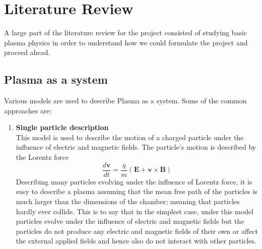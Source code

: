 \documentclass[12pt]{article}
\begin{document}
	\section{Literature Review}
	A large part of the literature review for the project consisted of studying basic plasma physics in order to understand how we could formulate the project and proceed ahead. 
	
	\subsection{Plasma as a system}
	Various models are used to describe Plasma as a system. Some of the common approaches are:
	\begin{enumerate}
		\item \textbf{Single particle description} \\
		This model is used to describe the motion of a charged particle under the influence of electric and magnetic fields. The particle's motion is described by the Lorentz force 
		\begin{equation}
			\label{eqn:lorentz}
			\frac{d \textbf{$\boldsymbol{v}$}}{d t} = \frac{q}{m} \left(\textbf{$\mathbf{E}$} + \textbf{$\boldsymbol{v}$} \times \textbf{$\mathbf{B}$} \right)
		\end{equation}
		Describing many particles evolving under the influence of Lorentz force, it is easy to describe a plasma assuming that the mean free path of the particles is much larger than the dimensions of the chamber; meaning that particles hardly ever collide. This is to say that in the simplest case, under this model particles evolve under the influence of electric and magnetic fields but the particles do not produce any electric and magnetic fields of their own or affect the external applied fields and hence also do not interact with other particles.
	

\end{enumerate}
\end{document}
